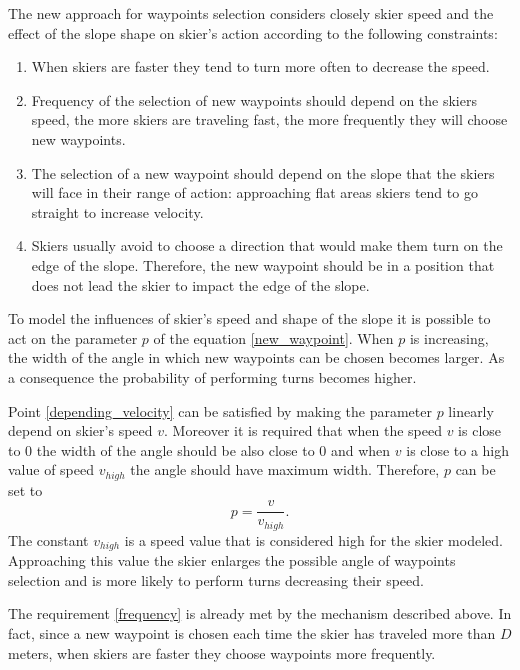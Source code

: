 \documentclass[12pt,a4paper,twoside]{book}
\begin{document}
The new approach for waypoints selection considers closely skier speed and the effect of the slope shape on skier's action according to the following constraints:\begin{enumerate}
\item \label{depending_velocity} When skiers are faster they tend to turn more often to decrease the speed.
\item \label{frequency} Frequency of the selection of new waypoints should depend on the skiers speed, the more skiers are traveling fast, the more frequently they will choose new waypoints.
\item \label{depending_slope} The selection of a new waypoint should depend on the slope that the skiers will face in their range of action: approaching flat areas skiers tend to go straight to increase velocity.
\item \label{avoid_impact} Skiers usually avoid to choose a direction that would make them turn on the edge of the slope. Therefore, the new waypoint should be in a position that does not lead the skier to impact the edge of the slope.
\end{enumerate}

To model the influences of skier's speed and shape of the slope it is possible to act on the parameter $p$ of the equation \ref{new_waypoint}. When $p$ is increasing, the width of the angle in which new waypoints can be chosen becomes larger. As a consequence the probability of performing turns becomes higher.

Point \ref{depending_velocity} can be satisfied by making the parameter $p$ linearly depend on skier's speed $v$. Moreover it is required that when the speed $v$ is close to $0$ the width of the angle should be also close to $0$ and when $v$ is close to a high value of speed $v_{high}$ the angle should have maximum width. Therefore, $p$ can be set to
\begin{equation}\label{delta_vel}
p= \frac{v}{v_{high}}.
\end{equation}
The constant $v_{high}$ is a speed value that is considered high for the skier modeled. Approaching this value the skier enlarges the possible angle of waypoints selection and is more likely to perform turns decreasing their speed.

The requirement \ref{frequency} is already met by the mechanism described above. In fact, since a new waypoint is chosen each time the skier has traveled more than $D$ meters, when skiers are faster they choose waypoints more frequently.
\end{document}
